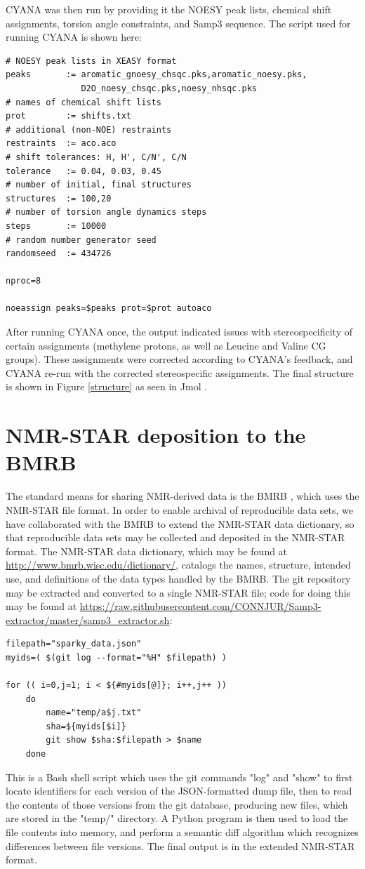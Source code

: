 CYANA was then run by providing it the NOESY peak lists, chemical shift
assignments, torsion angle constraints, and Samp3 sequence.  The script
used for running CYANA is shown here:
\begin{verbatim}
# NOESY peak lists in XEASY format
peaks       := aromatic_gnoesy_chsqc.pks,aromatic_noesy.pks,
               D2O_noesy_chsqc.pks,noesy_nhsqc.pks
# names of chemical shift lists
prot        := shifts.txt                
# additional (non-NOE) restraints
restraints  := aco.aco                   
# shift tolerances: H, H', C/N', C/N
tolerance   := 0.04, 0.03, 0.45          
# number of initial, final structures
structures  := 100,20                    
# number of torsion angle dynamics steps
steps       := 10000                    
# random number generator seed
randomseed  := 434726                    

nproc=8

noeassign peaks=$peaks prot=$prot autoaco
\end{verbatim}
After running CYANA once, the output indicated issues with stereospecificity
of certain assignments (methylene protons, as well as Leucine and Valine
CG groups).  These assignments were corrected according to CYANA's feedback,
and CYANA re-run with the corrected stereospecific assignments.
The final structure is shown in Figure \ref{structure} as seen in 
Jmol \cite{jmol}.


\section{NMR-STAR deposition to the BMRB}
The standard means for sharing NMR-derived data is the BMRB
\cite{bmrb}, which uses the NMR-STAR file format.  In order to enable archival
of reproducible data sets, we have collaborated with the BMRB to extend the
NMR-STAR data dictionary, so that reproducible data sets may be collected and
deposited in the NMR-STAR format.
The NMR-STAR data dictionary, which may be found at 
\url{http://www.bmrb.wisc.edu/dictionary/}, catalogs the names, structure,
intended use, and definitions of the data types handled by the BMRB.
The git repository may be extracted and converted to a single NMR-STAR file;
code for doing this may be found at 
\url{https://raw.githubusercontent.com/CONNJUR/Samp3-extractor/master/samp3_extractor.sh}:
\begin{verbatim}
filepath="sparky_data.json"
myids=( $(git log --format="%H" $filepath) )
 
for (( i=0,j=1; i < ${#myids[@]}; i++,j++ )) 
    do
        name="temp/a$j.txt"
        sha=${myids[$i]}
        git show $sha:$filepath > $name
    done
\end{verbatim}
This is a Bash shell script which uses the git commands "log" and "show" to 
first locate identifiers for
each version of the JSON-formatted dump file, then to read the contents of
those versions from the git database, producing new files, which are stored
in the "temp/" directory.  A Python program is then used to load the file
contents into memory, and perform a semantic diff algorithm which recognizes
differences between file versions.  The final output is in the extended
NMR-STAR format.

